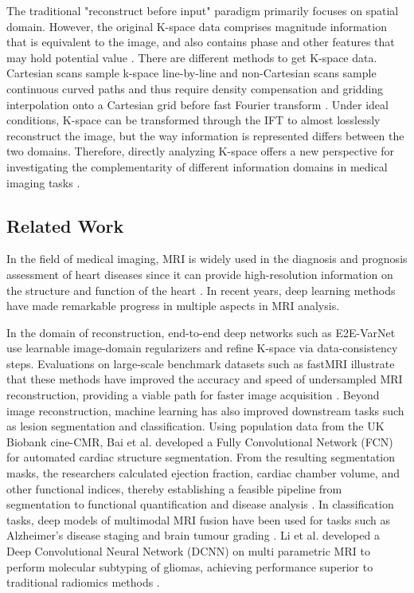 \documentclass[12pt,a4paper]{article}
\begin{document}
The traditional "reconstruct before input" paradigm primarily focuses on spatial domain. However, the original K-space data comprises magnitude information that is equivalent to the image, and also contains phase and other features that may hold potential value \cite{4}. There are different methods to get K-space data. Cartesian scans sample k-space line-by-line and non-Cartesian scans sample continuous curved paths and thus require density compensation and gridding interpolation onto a Cartesian grid before fast Fourier transform \cite{6}. Under ideal conditions, K-space can be transformed through the IFT to almost losslessly reconstruct the image, but the way information is represented differs between the two domains. Therefore, directly analyzing K-space offers a new perspective for investigating the complementarity of different information domains in medical imaging tasks \cite{7}.


\subsection{Related Work}

In the field of medical imaging, MRI is widely used in the diagnosis and prognosis assessment of heart diseases since it can provide high-resolution information on the structure and function of the heart \cite{8}. In recent years, deep learning methods have made remarkable progress in multiple aspects in MRI analysis.

In the domain of reconstruction, end-to-end deep networks such as E2E-VarNet use learnable image-domain regularizers and refine K-space via data-consistency steps. Evaluations on large-scale benchmark datasets such as fastMRI illustrate that these methods have improved the accuracy and speed of undersampled MRI reconstruction, providing a viable path for faster image acquisition \cite{9}. Beyond image reconstruction, machine learning has also improved downstream tasks such as lesion segmentation and classification. Using population data from the UK Biobank cine-CMR, Bai et al. developed a Fully Convolutional Network (FCN) for automated cardiac structure segmentation. From the resulting segmentation masks, the researchers calculated ejection fraction, cardiac chamber volume, and other functional indices, thereby establishing a feasible pipeline from segmentation to functional quantification and disease analysis \cite{10}. In classification tasks, deep models of multimodal MRI fusion have been used for tasks such as Alzheimer's disease staging and brain tumour grading \cite{28}. Li et al. developed a Deep Convolutional Neural Network (DCNN) on multi parametric MRI to perform molecular subtyping of gliomas, achieving performance superior to traditional radiomics methods \cite{11}.
\end{document}
